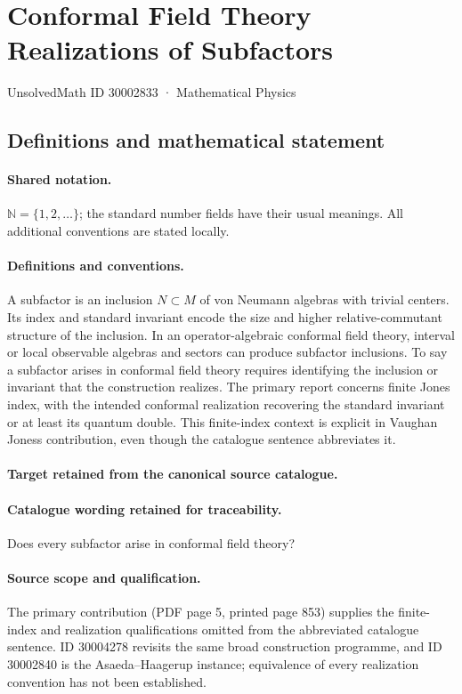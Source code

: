 \documentclass[11pt]{article}
\begin{document}
\setcounter{section}{30002832}
\section{Conformal Field Theory Realizations of Subfactors}\label{30002833}
{\small UnsolvedMath ID 30002833 · Mathematical Physics}
\subsection{Definitions and mathematical statement}

\paragraph{Shared notation.}$\mathbb N=\{1,2,\ldots\}$; the standard number fields have their usual meanings. All additional conventions are stated locally.


\paragraph{Definitions and conventions.}
A subfactor is an inclusion $N\subset M$ of von Neumann algebras with trivial centers. Its index and standard invariant encode the size and higher relative-commutant structure of the inclusion. In an operator-algebraic conformal field theory, interval or local observable algebras and sectors can produce subfactor inclusions. To say a subfactor arises in conformal field theory requires identifying the inclusion or invariant that the construction realizes. The primary report concerns finite Jones index, with the intended conformal realization recovering the standard invariant or at least its quantum double. This finite-index context is explicit in Vaughan Jones\textquotesingle s contribution, even though the catalogue sentence abbreviates it.

\paragraph{Target retained from the canonical source catalogue.}
\paragraph{Catalogue wording retained for traceability.}
Does every subfactor arise in conformal field theory?

\paragraph{Source scope and qualification.}
The primary contribution (PDF page 5, printed page 853) supplies the finite-index and realization qualifications omitted from the abbreviated catalogue sentence. ID 30004278 revisits the same broad construction programme, and ID 30002840 is the Asaeda--Haagerup instance; equivalence of every realization convention has not been established.
\end{document}
